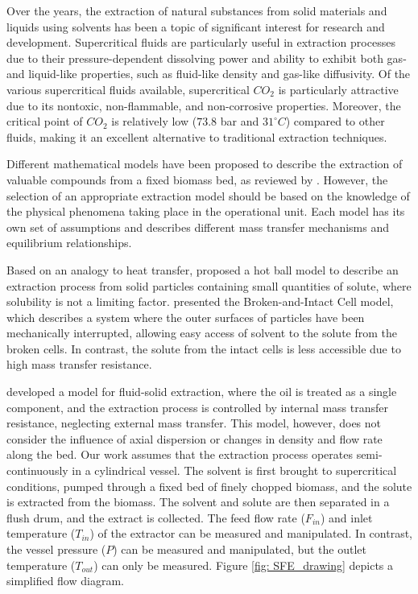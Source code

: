 \documentclass[../Article_Model_Parameters.tex]{subfiles}
\begin{document}
	
	Over the years, the extraction of natural substances from solid materials and liquids using solvents has been a topic of significant interest for research and development. Supercritical fluids are particularly useful in extraction processes due to their pressure-dependent dissolving power and ability to exhibit both gas- and liquid-like properties, such as fluid-like density and gas-like diffusivity. Of the various supercritical fluids available, supercritical $CO_2$ is particularly attractive due to its nontoxic, non-flammable, and non-corrosive properties. Moreover, the critical point of $CO_2$ is relatively low ($73.8$ bar and $31 ^\circ C$) compared to other fluids, making it an excellent alternative to traditional extraction techniques.
	
	Different mathematical models have been proposed to describe the extraction of valuable compounds from a fixed biomass bed, as reviewed by \citet{Huang2012}. However, the selection of an appropriate extraction model should be based on the knowledge of the physical phenomena taking place in the operational unit. Each model has its own set of assumptions and describes different mass transfer mechanisms and equilibrium relationships.
	
	Based on an analogy to heat transfer, \citet{Reverchon1993} proposed a hot ball model to describe an extraction process from solid particles containing small quantities of solute, where solubility is not a limiting factor. \citet{Sovova1994} presented the Broken-and-Intact Cell model, which describes a system where the outer surfaces of particles have been mechanically interrupted, allowing easy access of solvent to the solute from the broken cells. In contrast, the solute from the intact cells is less accessible due to high mass transfer resistance.
	
	\citet{Reverchon1996} developed a model for fluid-solid extraction, where the oil is treated as a single component, and the extraction process is controlled by internal mass transfer resistance, neglecting external mass transfer. This model, however, does not consider the influence of axial dispersion or changes in density and flow rate along the bed. Our work assumes that the extraction process operates semi-continuously in a cylindrical vessel. The solvent is first brought to supercritical conditions, pumped through a fixed bed of finely chopped biomass, and the solute is extracted from the biomass. The solvent and solute are then separated in a flush drum, and the extract is collected. The feed flow rate ($F_{in}$) and inlet temperature ($T_{in}$) of the extractor can be measured and manipulated. In contrast, the vessel pressure ($P$) can be measured and manipulated, but the outlet temperature ($T_{out}$) can only be measured. Figure \ref{fig: SFE_drawing} depicts a simplified flow diagram.
	
\end{document}
